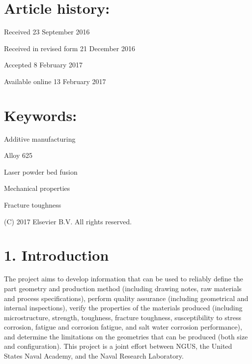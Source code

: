 \documentclass[10pt]{article}
\begin{document}
\section*{Article history:}
Received 23 September 2016

Received in revised form 21 December 2016

Accepted 8 February 2017

Available online 13 February 2017

\section*{Keywords:}
Additive manufacturing

Alloy 625

Laser powder bed fusion

Mechanical properties

Fracture toughness

\begin{abstract}
A B S T R A C T The mechanical, metallurgical and corrosion properties of Alloy 625 produced using the laser powder bed fusion (L-PBF) manufacturing process were investigated and compared with typical performance of the alloy produced using conventional forging processes. Test specimens were produced near net shape along with several demonstration pieces that were produced to examine the geometric complexity that could be achieved with the process. The additively manufactured specimens exhibited strength, fracture toughness and impact toughness that was equal to or better than properties typically achieved for wrought product. There was no evidence of stress corrosion cracking susceptibility in $3.5 \% \mathrm{NaCl}$ solution at stress intensities up to $70 \mathrm{ksi}^{1 / 2}$ after $700 \mathrm{~h}$ exposure. The microstructure was equiaxed in the plane of the powder bed build platform ( $\mathrm{X}-\mathrm{Y}$ ) and exhibited a columnar shape in the $\mathrm{Z}$ direction although there was not any significant evidence of anisotropy in the mechanical properties.
\end{abstract}

(C) 2017 Elsevier B.V. All rights reserved.

\section*{1. Introduction}
The project aims to develop information that can be used to reliably define the part geometry and production method (including drawing notes, raw materials and process specifications), perform quality assurance (including geometrical and internal inspections), verify the properties of the materials produced (including microstructure, strength, toughness, fracture toughness, susceptibility to stress corrosion, fatigue and corrosion fatigue, and salt water corrosion performance), and determine the limitations on the geometries that can be produced (both size and configuration). This project is a joint effort between NGUS, the United States Naval Academy, and the Naval Research Laboratory.
\end{document}
